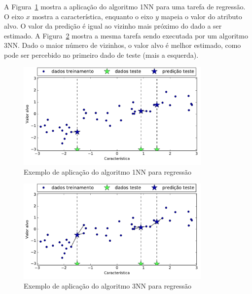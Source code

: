 A Figura~\ref{fig:exemplo-1nn-regressao} mostra a aplicação do algoritmo 1NN para uma tarefa de regressão. O eixo $x$ mostra a característica, enquanto o eixo $y$ mapeia o valor do atributo alvo. O valor da predição é igual ao vizinho mais próximo do dado a ser estimado. A Figura~\ref{fig:exemplo-3nn-regressao} mostra a mesma tarefa sendo executada por um algoritmo 3NN. Dado o maior número de vizinhos, o valor alvo é melhor estimado, como pode ser percebido no primeiro dado de teste (mais a esquerda).

\begin{figure}[h]
	\centering
	\includegraphics[width=0.85\textwidth]{img/exemplo-1nn-regressao}
	\caption{Exemplo de aplicação do algoritmo 1NN para regressão}
	\label{fig:exemplo-1nn-regressao}
\end{figure}

\begin{figure}[h!]
	\centering
	\includegraphics[width=0.85\textwidth]{img/exemplo-3nn-regressao}
	\caption{Exemplo de aplicação do algoritmo 3NN para regressão}
	\label{fig:exemplo-3nn-regressao}
\end{figure}

